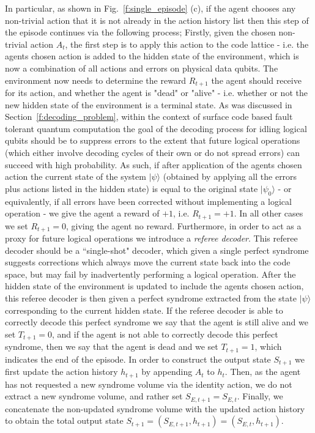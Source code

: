 \documentclass[twocolumn,preprintnumbers,amsmath,amssymb,notitlepage,nofootinbib,longbibliography,superscriptaddress,aps,pra,10pt]{revtex4-1}
\begin{document}
	In particular, as shown in Fig.~\ref{f:single_episode} (c), if the agent chooses any non-trivial action that it is not already in the action history list then this step of the episode continues via the following process;
	Firstly, given the chosen non-trivial action $A_t$, the first step is to apply this action to the code lattice - i.e. the agents chosen action is added to the hidden state of the environment, which is now a combination of all actions and errors on physical data qubits.
	The environment now needs to determine the reward $R_{t+1}$ the agent should receive for its action, and whether the agent is "dead" or "alive" - i.e. whether or not the new hidden state of the environment is a terminal state.
	As was discussed in Section~\ref{f:decoding_problem}, within the context of surface code based fault tolerant quantum computation the goal of the decoding process for idling logical qubits should be to suppress errors to the extent that future logical operations (which either involve decoding cycles of their own or do not spread errors) can succeed with high probability.
	As such, if after application of the agents chosen action the current state of the system $|\psi\rangle$ (obtained by applying all the errors plus actions listed in the hidden state) is equal to the original state $|\psi_0\rangle$ - or equivalently, if all errors have been corrected without implementing a logical operation - we give the agent a reward of $+1$, i.e. $R_{t+1} = +1$.
	In all other cases we set $R_{t+1} = 0$, giving the agent no reward.
	Furthermore, in order to act as a proxy for future logical operations we introduce a \textit{referee decoder}.
	This referee decoder should be a ``single-shot" decoder, which given a single perfect syndrome suggests corrections which always move the current state back into the code space, but may fail by inadvertently performing a logical operation.
	After the hidden state of the environment is updated to include the agents chosen action, this referee decoder is then given a perfect syndrome extracted from the state $|\psi\rangle$ corresponding to the current hidden state.
	If the referee decoder is able to correctly decode this perfect syndrome we say that the agent is still alive and we set $T_{t+1} = 0$, and if the agent is not able to correctly decode this perfect syndrome, then we say that the agent is dead and we set $T_{t+1}=1$, which indicates the end of the episode.
	In order to construct the output state $S_{t+1}$ we first update the action history $h_{t+1}$ by appending $A_t$ to $h_t$.
	Then, as the agent has not requested a new syndrome volume via the identity action, we do not extract a new syndrome volume, and rather set $S_{E,{t+1}} = S_{E,t}$.
	Finally, we concatenate the non-updated syndrome volume with the updated action history to obtain the total output state $S_{t+1} = (S_{E,t+1},h_{t+1}) = (S_{E,t},h_{t+1})$.
\end{document}
